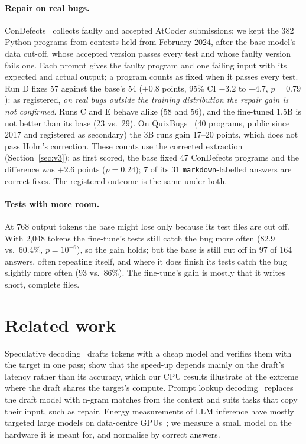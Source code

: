 \documentclass[11pt]{article}
\begin{document}
\paragraph{Repair on real bugs.} ConDefects~\citep{wu2023condefects} collects faulty and accepted
AtCoder submissions; we kept the 382 Python programs from contests held from February 2024, after
the base model's data cut-off, whose accepted version passes every test and whose faulty version
fails one. Each prompt gives the faulty program and one failing input with its expected and actual
output; a program counts as fixed when it passes every test. Run D fixes 57 against the base's 54
($+0.8$ points, 95\% CI $-3.2$ to $+4.7$, $p=0.79$): as registered, \emph{on real bugs outside the
training distribution the repair gain is not confirmed}. Runs C and E behave alike (58 and 56), and
the fine-tuned 1.5B is not better than its base (23 vs.\ 29). On QuixBugs~\citep{lin2017quixbugs}
(40 programs, public since 2017 and registered as secondary) the 3B runs gain 17--20 points, which
does not pass Holm's correction. These counts use the corrected extraction (Section~\ref{sec:v3}):
as first scored, the base fixed 47 ConDefects programs and the difference was $+2.6$ points
($p=0.24$); 7 of its 31 \texttt{markdown}-labelled answers are correct fixes. The registered outcome
is the same under both.

\paragraph{Tests with more room.} At 768 output tokens the base might lose only because its test
files are cut off. With 2{,}048 tokens the fine-tune's tests still catch the bug more often (82.9
vs.\ 60.4\%, $p=10^{-6}$), so the gain holds; but the base is still cut off in 97 of 164 answers,
often repeating itself, and where it does finish its tests catch the bug slightly more often (93 vs.\
86\%). The fine-tune's gain is mostly that it writes short, complete files.

\section{Related work}

Speculative decoding~\citep{leviathan2023fast,chen2023accelerating} drafts tokens with a cheap
model and verifies them with the target in one pass; \citet{yan2025decoding} show that the speed-up
depends mainly on the draft's latency rather than its accuracy, which our CPU results illustrate
at the extreme where the draft shares the target's compute. Prompt lookup decoding~\citep{saxena2023pld}
replaces the draft model with n-gram matches from the context and suits tasks that copy their input,
such as repair. Energy measurements of LLM inference have mostly targeted large models on
data-centre GPUs~\citep{samsi2023words,luccioni2024power}; we measure a small model on the
hardware it is meant for, and normalise by correct answers.
\end{document}
